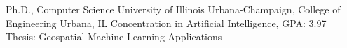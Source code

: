 
        {Ph.D., Computer Science}
        {University of Illinois Urbana-Champaign, College of Engineering}
        {Urbana, IL}
        {Concentration in Artificial Intelligence, GPA: 3.97}
        {Thesis: Geospatial Machine Learning Applications}